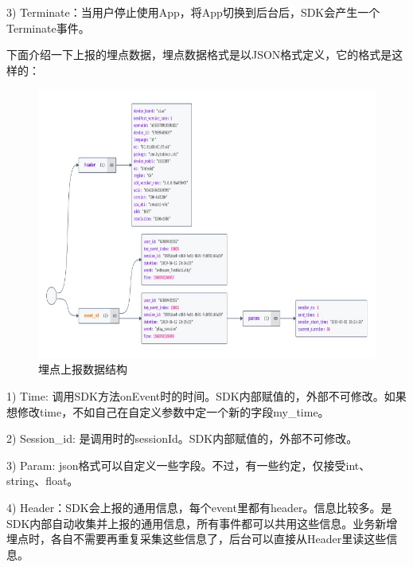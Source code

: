 3)	Terminate：当用户停止使用App，将App切换到后台后，SDK会产生一个Terminate事件。

下面介绍一下上报的埋点数据，埋点数据格式是以JSON格式定义，它的格式是这样的：

  \begin{figure}[htb]
  \centering
  \includegraphics[width=5in]{figure/chapter4/埋点上报数据结构.jpg}
  \caption{埋点上报数据结构}\label{maidanshujujiegou}
\end{figure}
1)	Time: 调用SDK方法onEvent时的时间。SDK内部赋值的，外部不可修改。如果想修改time，不如自己在自定义参数中定一个新的字段my\_time。

2)	Session\_id: 是调用时的sessionId。SDK内部赋值的，外部不可修改。

3)	Param: json格式可以自定义一些字段。不过，有一些约定，仅接受int、string、float。

4)	Header：SDK会上报的通用信息，每个event里都有header。信息比较多。是SDK内部自动收集并上报的通用信息，所有事件都可以共用这些信息。业务新增埋点时，各自不需要再重复采集这些信息了，后台可以直接从Header里读这些信息。

